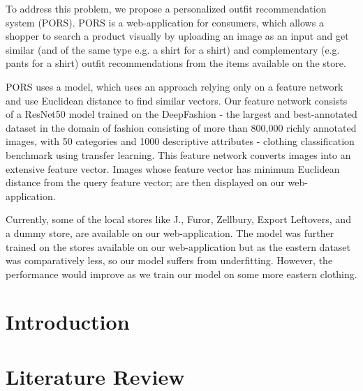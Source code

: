\documentclass[12pt]{report}
\begin{document}
To address this problem, we propose a personalized outfit recommendation system (PORS). PORS is a web-application for consumers, which allows a shopper to search a product visually by uploading an image as an input and get similar (and of the same type e.g. a shirt for a shirt) and complementary (e.g. pants for a shirt) outfit recommendations from the items available on the store.\newline

PORS uses a model, which uses an approach relying only on a feature network and use Euclidean distance to find similar vectors. Our feature network consists of a ResNet50 model trained on the DeepFashion - the largest and best-annotated dataset in the domain of fashion consisting of more than 800,000 richly annotated images, with 50 categories and 1000 descriptive attributes - clothing classification benchmark using transfer learning. This feature network converts images into an extensive feature vector. Images whose feature vector has minimum Euclidean distance from the query feature vector; are then displayed on our web-application.\newline

Currently, some of the local stores like J., Furor, Zellbury, Export Leftovers, and a dummy store, are available on our web-application. The model was further trained on the stores available on our web-application but as the eastern dataset was comparatively less, so our model suffers from underfitting. However, the performance would improve as we train our model on some more eastern clothing. 

\tableofcontents
\listoffigures
\listoftables


\chapter{Introduction}
\label{chap:intro}


\chapter{Literature Review}
\label{chap:lit}

\end{document}
